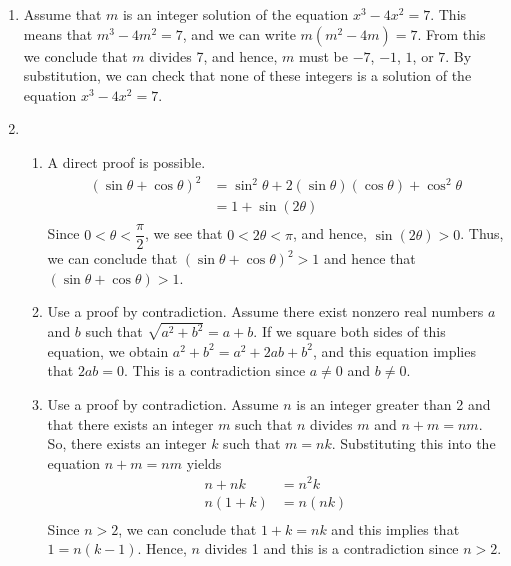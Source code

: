 \begin{enumerate}
\item Assume that $m$ is an integer solution of the equation $x^3 - 4x^2 = 7$.  This means that 
$m^3 - 4m^2 = 7$, and we can write $m\left( m^2 - 4m \right) = 7$.  From this we conclude that 
$m$ divides 7, and hence, $m$ must be $-7$, $-1$, $1$, or $7$.  By substitution, we can check that none of these integers is a solution of the equation $x^3 - 4x^2 = 7$.





\item \begin{enumerate}
\item A direct proof is possible.
\[
\begin{aligned}
\left( \sin \theta + \cos \theta \right)^2 &= \sin^2 \theta + 2 \left( \sin \theta \right) \left( \cos \theta \right) + \cos^2 \theta \\
                                           &= 1 + \sin \left( 2 \theta \right) \\
\end{aligned}
\]
Since $0 < \theta < \dfrac{\pi}{2}$, we see that $0 < 2 \theta < \pi$, and hence, 
$\sin \left( 2 \theta \right) > 0$.  Thus, we can conclude that 
$\left( \sin \theta + \cos \theta \right)^2 > 1$ and hence that \\
$\left( \sin \theta + \cos \theta \right) > 1$.

\item Use a proof by contradiction.  Assume there exist nonzero real numbers $a$ and $b$ such that $\sqrt{a^2 + b^2} = a + b$.  If we square both sides of this equation, we obtain 
$a^2 + b^2 = a^2 + 2ab + b^2$, and this equation implies that $2ab = 0$.  This is a contradiction since $a \ne 0$ and $b \ne 0$.

\item Use a proof by contradiction.  Assume $n$ is an integer greater than 2 and that there exists an integer $m$ such that $n$ divides $m$ and $n + m = nm$.  So, there exists an integer $k$ such that $m = nk$.  Substituting this into the equation $n + m = nm$ yields
\[
\begin{aligned}
n + nk &= n^2 k \\
n \left( 1 + k \right) &= n \left( nk \right) \\
\end{aligned}
\]
Since $n > 2$, we can conclude that $1 + k = nk$ and this implies that 
$1 = n \left( k - 1 \right)$.  Hence, $n$ divides 1 and this is a contradiction since $n > 2$.



\end{enumerate}
\end{enumerate}

